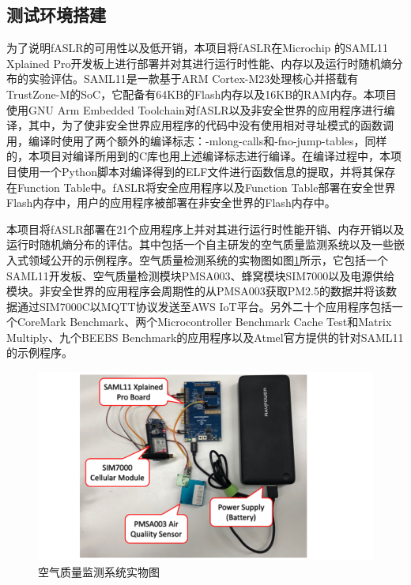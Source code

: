 \documentclass[12pt,a4paper]{ctexart}
\numberwithin{figure}{section}
\begin{document}
\subsection{测试环境搭建}
\par 为了说明fASLR的可用性以及低开销，本项目将fASLR在Microchip 的SAML11 Xplained Pro开发板上进行部署并对其进行运行时性能、内存以及运行时随机熵分布的实验评估。SAML11是一款基于ARM Cortex-M23处理核心并搭载有TrustZone-M的SoC，它配备有64KB的Flash内存以及16KB的RAM内存。本项目使用GNU Arm Embedded Toolchain对fASLR以及非安全世界的应用程序进行编译，其中，为了使非安全世界应用程序的代码中没有使用相对寻址模式的函数调用，编译时使用了两个额外的编译标志：-mlong-calls和-fno-jump-tables，同样的，本项目对编译所用到的C库也用上述编译标志进行编译。在编译过程中，本项目使用一个Python脚本对编译得到的ELF文件进行函数信息的提取，并将其保存在Function Table中。fASLR将安全应用程序以及Function Table部署在安全世界Flash内存中，用户的应用程序被部署在非安全世界的Flash内存中。
\par 本项目将fASLR部署在21个应用程序上并对其进行运行时性能开销、内存开销以及运行时随机熵分布的评估。其中包括一个自主研发的空气质量监测系统以及一些嵌入式领域公开的示例程序。空气质量检测系统的实物图如图\ref{physicalDrawing}所示，它包括一个SAML11开发板、空气质量检测模块PMSA003、蜂窝模块SIM7000以及电源供给模块。非安全世界的应用程序会周期性的从PMSA003获取PM2.5的数据并将该数据通过SIM7000C以MQTT协议发送至AWS IoT平台。另外二十个应用程序包括一个CoreMark Benchmark\cite{CoreMarkBenchmark}、两个Microcontroller Benchmark Cache Test和Matrix Multiply、九个BEEBS Benchmark\cite{BEEBSBenchmark}的应用程序以及Atmel官方\cite{Atmel}提供的针对SAML11的示例程序。
\begin{figure}[H] %
    \label{physicalDrawing}
    \centering
    \includegraphics[scale=0.8]{graph/physicalDrawing.png}
    \caption{空气质量监测系统实物图}
\end{figure}
\end{document}
